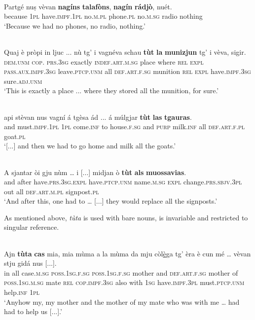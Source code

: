 \ea
\label{}
\\
\gll Partgé nuṣ vèvan \textbf{nagíns} \textbf{talafòns}, \textbf{nagín} \textbf{rádjò}, nuét.\\
because \textsc{1pl} have.\textsc{impf.1pl} no.\textsc{m.pl} phone.\textsc{pl} no.\textsc{m.sg} radio nothing\\
\glt `Because we had no phones, no radio, nothing.'
\z

\ea
\label{}
\\
\gll  Quaj è pròpi in ljuc ... nù tg’ i vagnéva schau \textbf{tùt} \textbf{la} \textbf{munizjun} tg’ i vèva, sigir.\\
\textsc{dem.unm} \textsc{cop. prs.3sg} exactly \textsc{indef.art.m.sg} place {} where \textsc{rel} \textsc{expl} \textsc{pass.aux.impf.3sg} leave.\textsc{ptcp.unm} all \textsc{def.art.f.sg} munition \textsc{rel} \textsc{expl} have.\textsc{impf.3sg} sure.\textsc{adj.unm}\\
\glt `This is exactly a place ... where they stored all the munition, for sure.'
\z

\ea\label{}
\\
\gll  [...] api stèvan nus vagní á tgèsa ád ... á múlgjar \textbf{tùt} \textbf{las} \textbf{tgauras}.\\
{} and must.\textsc{impf.1pl} \textsc{1pl} come.\textsc{inf} to house.\textsc{f.sg} and {} \textsc{purp} milk.\textsc{inf} all \textsc{def.art.f.pl} goat.\textsc{pl}\\
\glt `[...] and then we had to go home and milk all the goats.'
\z

\ea
\label{}
\\
\gll A sjantar òi gju nùm … i [...] midjan ò \textbf{tùt} \textbf{als} \textbf{muossavias}.\\
and after have.\textsc{prs.3sg.expl} have.\textsc{ptcp.unm} name.\textsc{m.sg} {} \textsc{expl}  {} change.\textsc{prs.sbjv.3pl} out all \textsc{def.art.m.pl} signpost.\textsc{pl}\\
\glt `And after this, one had to … [...] they would replace all the signposts.'
\z

As mentioned above, \textit{tùta} is used with bare nouns, is invariable and restricted to singular reference.

\ea\label{}
\\
	\gll    Ajn \textbf{tùta} \textbf{cas} mia, mia mùma a la mùma da mju còl\underline{è}ga tg’ èra è cun mé … vèvan stju gidá nus [...].\\
in all case.\textsc{m.sg} \textsc{poss.1sg.f.sg}  \textsc{poss.1sg.f.sg} mother and \textsc{def.art.f.sg} mother of  \textsc{poss.1sg.m.sg} mate \textsc{rel}  \textsc{cop.impf.3sg} also with \textsc{1sg} {}  have.\textsc{impf.3pl} must.\textsc{ptcp.unm} help.\textsc{inf} \textsc{1pl}\\
\glt `Anyhow my, my mother and the mother of my mate who was with me … had had to help us [...].'
\z

